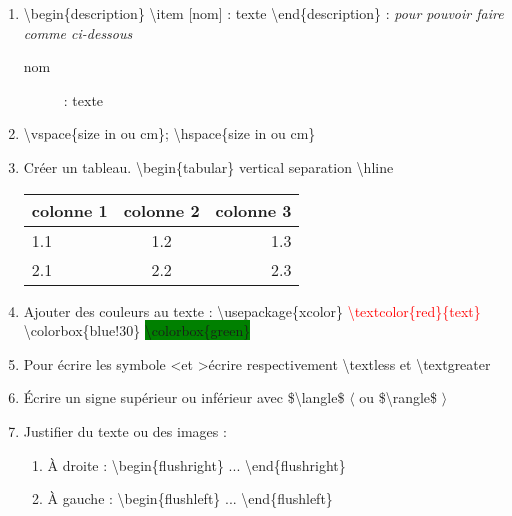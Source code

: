 \documentclass[12pt, letterpaper]{article}
\begin{document}
\begin{enumerate}
\item \textbackslash begin\{description\} \textbackslash item [nom] : texte \textbackslash end\{description\} : \textit{pour pouvoir faire comme ci-dessous}
\begin{description}
\item [nom] : texte
\end{description}
\item \textbackslash vspace\{size in ou cm\}; \textbackslash hspace\{size in ou cm\}
\item Créer un tableau. \textbackslash begin\{tabular\} vertical separation \textbackslash hline
\newline \begin{tabular}{|l|c|r|}
  \hline
  colonne 1 & colonne 2 & colonne 3 \\
  \hline
  1.1 & 1.2 & 1.3 \\ \hline
  2.1 & 2.2 & 2.3 \\
  \hline
\end{tabular}
\item Ajouter des couleurs au texte : \textbackslash usepackage\{xcolor\}
\newline \textcolor{red}{\textbackslash textcolor\{red\}\{text\}}
\newline \colorbox{blue!30}{\textbackslash colorbox\{blue!30\}}
\newline \colorbox{green}{\textbackslash colorbox\{green\}}
\item Pour écrire les symbole \textless et \textgreater écrire respectivement \textbackslash textless et \textbackslash textgreater
\item Écrire un signe supérieur ou inférieur avec \$\textbackslash langle\$ $\langle$ ou \$\textbackslash rangle\$ $\rangle$
\item Justifier du texte ou des images :
\begin{enumerate}
\item À droite : \textbackslash begin\{flushright\} ... \textbackslash end\{flushright\}
\item À gauche : \textbackslash begin\{flushleft\} ... \textbackslash end\{flushleft\}
\end{enumerate}
\end{enumerate}
\end{document}

